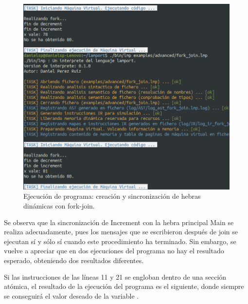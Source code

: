 \newpage

\begin{figure}[h]
    \includegraphics[width=\linewidth]{images/ejemplos/concurrentes/fork_join.png}
    \caption{Ejecución de programa: creación y sincronización de hebras dinámicas con fork-join.}
    \label{fig:lamportForkJoin_exec}
\end{figure}

Se observa que la sincronización de Increment con la hebra principal Main se realiza adecuadamente, pues los mensajes que se escribieron después de join se ejecutan sí y sólo sí cuando este procedimiento ha terminado. Sin embargo, se vuelve a apreciar que en dos ejecuciones del programa no hay el resultado esperado, obteniendo dos resultados diferentes.

\newpage
Si las instrucciones de las líneas 11 y 21 se engloban dentro de una sección atómica, el resultado de la ejecución del programa es el siguiente, donde siempre se conseguirá el valor deseado de la variable .

